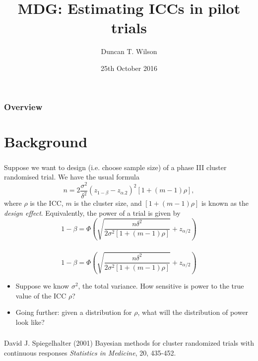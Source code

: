 \documentclass{beamer}
\title{MDG: Estimating ICCs in pilot trials}
\author{Duncan T. Wilson}
\institute[LICTR] %
{
\texttt{[image: U:/Misc/Logos/LICTR\_logo]}\\
Clinical Trials Research Unit \\ %
Leeds Institute of Clinical Trials Research \\
University of Leeds \\
\medskip
\textit{d.t.wilson@leeds.ac.uk} %
}
\date{25th October 2016} %
\begin{document}
\begin{frame}
\titlepage %
\end{frame}

\begin{frame}
\frametitle{Overview}
\tableofcontents 
\end{frame}


\section{Background}

\begin{frame}
\frametitle{}

Suppose we want to design (i.e. choose sample size) of a phase III cluster randomised trial. We have the usual formula
\begin{equation}
n = 2 \frac{\sigma^{2}}{\delta^{2}}(z_{1-\beta} - z_{\alpha.2})^{2}[1+(m-1)\rho],
\end{equation}
where $\rho$ is the ICC, $m$ is the cluster size, and $[1+(m-1)\rho]$ is known as the \emph{design effect}. Equivalently, the power of a trial is given by
\begin{equation}
1-\beta = \Phi\left( \sqrt{ \frac{n\delta^{2}}{2\sigma^{2}[1+(m-1)\rho]} } + z_{\alpha/2} \right)
\end{equation}
\end{frame}

\begin{frame}
\frametitle{}
\begin{equation}
1-\beta = \Phi\left( \sqrt{ \frac{n\delta^{2}}{2\sigma^{2}[1+(m-1)\rho]} } + z_{\alpha/2} \right)
\end{equation}
\begin{itemize}
\item Suppose we know $\sigma^{2}$, the total variance. How sensitive is power to the true value of the ICC $\rho$? 
\item Going further: given a distribution for $\rho$, what will the distribution of power look like?
\end{itemize}
\end{frame}

\begin{frame}
\frametitle{}
\begin{thebibliography}{99}
 David J. Spiegelhalter (2001) 
\newblock Bayesian methods for cluster randomized trials with continuous responses
\newblock \emph{Statistics in Medicine}, 20, 435-452.
\end{thebibliography}
\end{frame}
\end{document}
